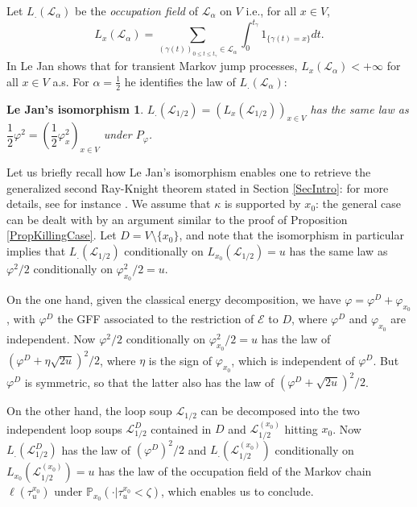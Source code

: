 \documentclass[11pt,a4paper]{amsart}
\numberwithin{equation}{section}
\newtheorem*{IsoLeJan}{Le Jan's isomorphism}
\begin{document}
Let  $L_{.}(\mathcal{L}_{\alpha})$ be the \textit{occupation field} of $\mathcal{L}_{\alpha}$ on $V$ i.e., for all $x\in V$, 
\begin{displaymath}
L_x(\mathcal{L}_{\alpha})=
\sum_{(\gamma(t))_{0\leq t\leq t_{\gamma}}\in\mathcal{L}_{\alpha}}
\int_{0}^{t_{\gamma}}1_{\{\gamma(t)=x\}} dt.
\end{displaymath}
In \cite{LeJan2011Loops} Le Jan shows that for transient Markov jump processes, $L_x(\mathcal{L}_{\alpha})<+\infty$ for all $x\in V$ a.s. For $\alpha=\frac{1}{2}$ he identifies the law of
$L_.(\mathcal{L}_{\alpha})$:
\begin{IsoLeJan}
$L_.(\mathcal{L}_{1/2})=\left(L_x(\mathcal{L}_{1/2})\right)_{x\in V}$ has the same law as
$\dfrac{1}{2}\varphi^2=\left(\dfrac{1}{2}\varphi_{x}^{2}\right)_{x\in V}$
under $P_{\varphi}$.
\end{IsoLeJan}

Let us briefly recall how Le Jan's isomorphism enables one to retrieve the generalized second Ray-Knight theorem stated in Section \ref{SecIntro}: for more details, see for instance \cite{lejan4}. We assume that $\kappa$ is supported by $x_0$: the general case can be dealt with by an argument similar to the proof of Proposition \ref{PropKillingCase}. 
Let $D=V\setminus\{x_0\}$, and note that the isomorphism in particular implies that $L_.(\mathcal{L}_{1/2})$ conditionally on $L_{x_0}(\mathcal{L}_{1/2})=u$ has the same law as $\varphi^2/2$ conditionally on $\varphi_{x_0}^2/2=u$. 

On the one hand, given the classical energy decomposition, we have $\varphi=\varphi^D+\varphi_{x_0}$, with $\varphi^D$ the GFF associated to the restriction of $\mathcal{E}$ to $D$, where $\varphi^D$ and $\varphi_{x_0}$ are independent. Now $\varphi^2/2$ conditionally on $\varphi_{x_0}^2/2=u$ has the law of $(\varphi^D+\eta\sqrt{2u})^2/2$, where $\eta$ is the sign of $\varphi_{x_0}$, which is independent of $\varphi^D$. But $\varphi^D$ is symmetric, so that the latter also has the law of $(\varphi^D+\sqrt{2u})^2/2$.

On the other hand, the loop soup $\mathcal{L}_{1/2}$ can be decomposed into the two independent loop soups $\mathcal{L}_{1/2}^D$ contained in $D$ and $\mathcal{L}_{1/2}^{(x_0)}$ hitting $x_0$. Now $L_.(\mathcal{L}_{1/2}^D)$ has the law of $(\varphi^D)^2/2$ and  $L_.(\mathcal{L}_{1/2}^{(x_0)})$ conditionally on $L_{x_0}(\mathcal{L}_{1/2}^{(x_0)})=u$ has the law of the occupation field of the Markov chain $\ell(\tau_{u}^{x_{0}})$
under $\mathbb{P}_{x_{0}}(\cdot \vert \tau_{u}^{x_{0}}<\zeta)$, which enables us to conclude.
\end{document}
